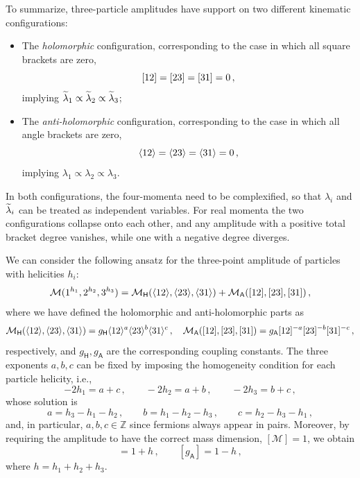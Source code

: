To summarize, three-particle amplitudes have support on two different kinematic configurations:
\begin{itemize}
    \item[($\mathsf H$)] The \textit{holomorphic} configuration, corresponding to the case in which all square brackets are zero,
    \begin{equation}
        \lbrack 1 2 \rbrack=\lbrack 2 3 \rbrack=\lbrack 3 1 \rbrack=0\,,
    \end{equation}
    implying $\widetilde{\lambda}_1\propto \widetilde{\lambda}_2 \propto \widetilde{\lambda}_3$;
    \item[($\mathsf A$)] The \textit{anti-holomorphic} configuration, corresponding to the case in which all angle brackets are zero,
    \begin{equation}
        \langle 1 2 \rangle=\langle 2 3 \rangle=\langle 3 1 \rangle=0\,,
    \end{equation}
    implying $\lambda_1\propto \lambda_2 \propto \lambda_3$.
\end{itemize}
In both configurations, the four-momenta need to be complexified, so that $\lambda_i$ and $\widetilde{\lambda}_i$ can be treated as independent variables. For real momenta the two configurations collapse onto each other, and any amplitude with a positive total bracket degree vanishes, while one with a negative degree diverges.

We can consider the following ansatz for the three-point amplitude of particles with helicities $h_i$:
\begin{equation}
    \mathcal M (1^{h_1},2^{h_2},3^{h_3}) = \mathcal M_{\mathsf H}(\langle 1 2 \rangle,\langle 2 3 \rangle,\langle 3 1 \rangle) + \mathcal M_{\mathsf A}(\lbrack 1 2 \rbrack,\lbrack 2 3 \rbrack,\lbrack 3 1 \rbrack)\,,
\end{equation}
where we have defined the holomorphic and anti-holomorphic parts as
\begin{equation}
    \mathcal M_{\mathsf H}(\langle 1 2 \rangle,\langle 2 3 \rangle,\langle 3 1 \rangle) = g_{\mathsf H} \langle 1 2 \rangle^a \langle 2 3 \rangle^b \langle 3 1 \rangle^c \,,\quad
    \mathcal M_{\mathsf A}(\lbrack 1 2 \rbrack,\lbrack 2 3 \rbrack,\lbrack 3 1 \rbrack) = g_{\mathsf A} \lbrack 1 2 \rbrack^{-a} \lbrack 2 3 \rbrack^{-b} \lbrack 3 1 \rbrack^{-c}\,,
\end{equation}
respectively, and $g_{\mathsf H},g_{\mathsf A}$ are the corresponding coupling constants.
The three exponents $a,b,c$ can be fixed by imposing the homogeneity condition for each particle helicity, i.e.,
\begin{equation}
    -2h_1 = a+c\,,\qquad -2h_2=a+b\,,\qquad -2h_3=b+c\,,
\end{equation}
whose solution is
\begin{equation}
    a = h_3-h_1-h_2\,,
    \qquad
     b = h_1-h_2-h_3\,,
     \qquad
      c = h_2-h_3-h_1\,,
\end{equation}
and, in particular, $a,b,c\in\mathbb Z$ since fermions always appear in pairs.
Moreover, by requiring the amplitude to have the correct mass dimension, $[\mathcal M]=1$, we obtain
\begin{equation}
    [g_{\mathsf H}] = 1+h\,,\qquad [g_{\mathsf A}] = 1-h\,,
\end{equation}
where $h=h_1+h_2+h_3$.

